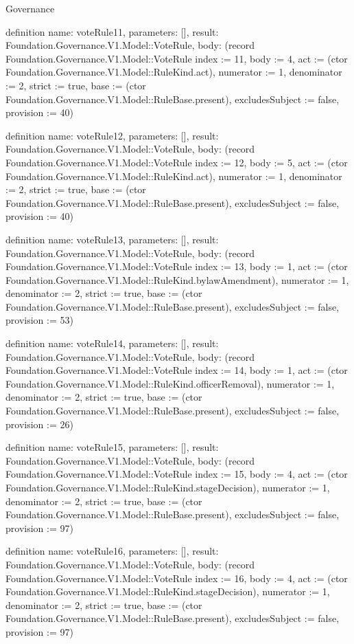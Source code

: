 \begin{lexlean}{Governance}
\begin{semanticmodule}
definition{
  name: voteRule11,
  parameters: [],
  result: Foundation.Governance.V1.Model::VoteRule,
  body: (record Foundation.Governance.V1.Model::VoteRule {index := 11, body := 4, act := (ctor Foundation.Governance.V1.Model::RuleKind.act), numerator := 1, denominator := 2, strict := true, base := (ctor Foundation.Governance.V1.Model::RuleBase.present), excludesSubject := false, provision := 40})
}

definition{
  name: voteRule12,
  parameters: [],
  result: Foundation.Governance.V1.Model::VoteRule,
  body: (record Foundation.Governance.V1.Model::VoteRule {index := 12, body := 5, act := (ctor Foundation.Governance.V1.Model::RuleKind.act), numerator := 1, denominator := 2, strict := true, base := (ctor Foundation.Governance.V1.Model::RuleBase.present), excludesSubject := false, provision := 40})
}

definition{
  name: voteRule13,
  parameters: [],
  result: Foundation.Governance.V1.Model::VoteRule,
  body: (record Foundation.Governance.V1.Model::VoteRule {index := 13, body := 1, act := (ctor Foundation.Governance.V1.Model::RuleKind.bylawAmendment), numerator := 1, denominator := 2, strict := true, base := (ctor Foundation.Governance.V1.Model::RuleBase.present), excludesSubject := false, provision := 53})
}

definition{
  name: voteRule14,
  parameters: [],
  result: Foundation.Governance.V1.Model::VoteRule,
  body: (record Foundation.Governance.V1.Model::VoteRule {index := 14, body := 1, act := (ctor Foundation.Governance.V1.Model::RuleKind.officerRemoval), numerator := 1, denominator := 2, strict := true, base := (ctor Foundation.Governance.V1.Model::RuleBase.present), excludesSubject := false, provision := 26})
}

definition{
  name: voteRule15,
  parameters: [],
  result: Foundation.Governance.V1.Model::VoteRule,
  body: (record Foundation.Governance.V1.Model::VoteRule {index := 15, body := 4, act := (ctor Foundation.Governance.V1.Model::RuleKind.stageDecision), numerator := 1, denominator := 2, strict := true, base := (ctor Foundation.Governance.V1.Model::RuleBase.present), excludesSubject := false, provision := 97})
}

definition{
  name: voteRule16,
  parameters: [],
  result: Foundation.Governance.V1.Model::VoteRule,
  body: (record Foundation.Governance.V1.Model::VoteRule {index := 16, body := 4, act := (ctor Foundation.Governance.V1.Model::RuleKind.stageDecision), numerator := 1, denominator := 2, strict := true, base := (ctor Foundation.Governance.V1.Model::RuleBase.present), excludesSubject := false, provision := 97})
}


\end{semanticmodule}
\end{lexlean}
